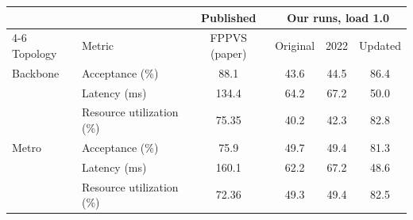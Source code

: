 \begin{tabular}{llcccc}
\toprule
 & & Published & \multicolumn{3}{c}{Our runs, load 1.0} \\
\cmidrule(lr){4-6}
Topology & Metric & FPPVS (paper) & Original & 2022 & Updated \\
\midrule
Backbone & Acceptance (\%) & 88.1 & 43.6 & 44.5 & 86.4 \\
 & Latency (ms) & 134.4 & 64.2 & 67.2 & 50.0 \\
 & Resource utilization (\%) & 75.35 & 40.2 & 42.3 & 82.8 \\
\midrule
Metro & Acceptance (\%) & 75.9 & 49.7 & 49.4 & 81.3 \\
 & Latency (ms) & 160.1 & 62.2 & 67.2 & 48.6 \\
 & Resource utilization (\%) & 72.36 & 49.3 & 49.4 & 82.5 \\
\bottomrule
\end{tabular}
